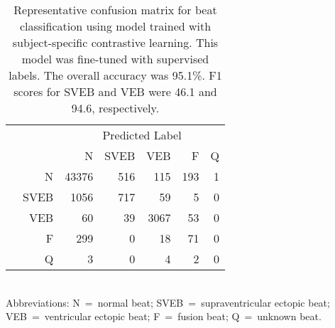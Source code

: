 \documentclass{article}
\begin{document}
\begin{table}[H]
  \caption{Representative confusion matrix for beat classification using model
  trained with subject-specific contrastive learning. This model was fine-tuned
  with supervised labels. The overall accuracy was 95.1\%. F1 scores for SVEB
  and VEB were 46.1 and 94.6, respectively.}
  \label{table:ecg:confusion}
  \centering
\begin{tabular}{rr|rrrrr}
    \toprule
    & & \multicolumn{5}{c}{Predicted Label} \\
    & &     N & SVEB &  VEB &   F & Q \\
    \hline
    \parbox[t]{2mm}{}
    &    N & 43376 &  516 &  115 & 193 & 1 \\
    & SVEB &  1056 &  717 &   59 &   5 & 0 \\
    &  VEB &    60 &   39 & 3067 &  53 & 0 \\
    &    F &   299 &    0 &   18 &  71 & 0 \\
    &    Q &     3 &    0 &    4 &   2 & 0 \\
    \bottomrule
  \end{tabular}\\
  \footnotesize{Abbreviations: N~=~normal beat; SVEB~=~supraventricular ectopic beat; VEB~=~ventricular ectopic beat; F~=~fusion beat; Q~=~unknown beat.}
\end{table} 
\end{document}
